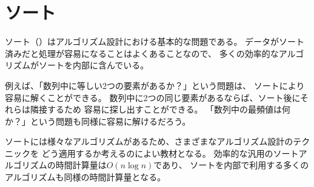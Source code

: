 \begin{comment}
\chapter{Sorting}
\end{comment}
\chapter{ソート}


\begin{comment}
\key{Sorting}
is a fundamental algorithm design problem.
Many efficient algorithms
use sorting as a subroutine,
because it is often easier to process
data if the elements are in a sorted order.

For example, the problem ''does an array contain
two equal elements?'' is easy to solve using sorting.
If the array contains two equal elements,
they will be next to each other after sorting,
so it is easy to find them.
Also, the problem ''what is the most frequent element
in an array?'' can be solved similarly.
\end{comment}

ソート（）はアルゴリズム設計における基本的な問題である。
データがソート済みだと処理が容易になることはよくあることなので、
多くの効率的なアルゴリズムがソートを内部に含んでいる。

例えば、「数列中に等しい2つの要素があるか？」という問題は、
ソートにより容易に解くことができる。
数列中に2つの同じ要素があるならば、ソート後にそれらは隣接するため
容易に探し出すことができる。
「数列中の最頻値は何か？」という問題も同様に容易に解けるだろう。

\begin{comment}
There are many algorithms for sorting, and they are
also good examples of how to apply
different algorithm design techniques.
The efficient general sorting algorithms
work in $O(n \log n)$ time,
and many algorithms that use sorting
as a subroutine also
have this time complexity.
\end{comment}

ソートには様々なアルゴリズムがあるため、さまざまなアルゴリズム設計のテクニックを
どう適用するか考えるのによい教材となる。
効率的な汎用のソートアルゴリズムの時間計算量は$O(n \log n)$であり、
ソートを内部で利用する多くのアルゴリズムも同様の時間計算量となる。

\begin{comment}
\section{Sorting theory}

The basic problem in sorting is as follows:
\begin{framed}
\noindent
Given an array that contains $n$ elements,
your task is to sort the elements
in increasing order.
\end{framed}
\noindent
For example, the array
\end{comment}

